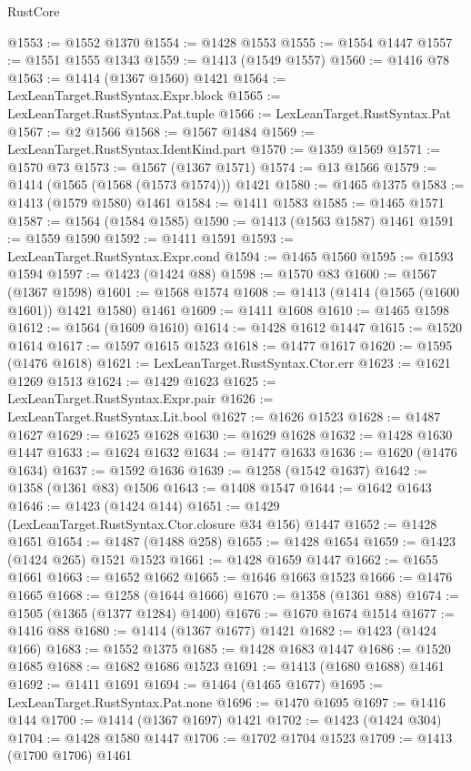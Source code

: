 \begin{lexlean}{RustCore}
\begin{coremodule}
@1553 := @1552 @1370
@1554 := @1428 @1553
@1555 := @1554 @1447
@1557 := @1551 @1555 @1343
@1559 := @1413 (@1549 @1557)
@1560 := @1416 @78
@1563 := @1414 (@1367 @1560) @1421
@1564 := LexLeanTarget.RustSyntax.Expr.block
@1565 := LexLeanTarget.RustSyntax.Pat.tuple
@1566 := LexLeanTarget.RustSyntax.Pat
@1567 := @2 @1566
@1568 := @1567 @1484
@1569 := LexLeanTarget.RustSyntax.IdentKind.part
@1570 := @1359 @1569
@1571 := @1570 @73
@1573 := @1567 (@1367 @1571)
@1574 := @13 @1566
@1579 := @1414 (@1565 (@1568 (@1573 @1574))) @1421
@1580 := @1465 @1375
@1583 := @1413 (@1579 @1580) @1461
@1584 := @1411 @1583
@1585 := @1465 @1571
@1587 := @1564 (@1584 @1585)
@1590 := @1413 (@1563 @1587) @1461
@1591 := @1559 @1590
@1592 := @1411 @1591
@1593 := LexLeanTarget.RustSyntax.Expr.cond
@1594 := @1465 @1560
@1595 := @1593 @1594
@1597 := @1423 (@1424 @88)
@1598 := @1570 @83
@1600 := @1567 (@1367 @1598)
@1601 := @1568 @1574
@1608 := @1413 (@1414 (@1565 (@1600 @1601)) @1421 @1580) @1461
@1609 := @1411 @1608
@1610 := @1465 @1598
@1612 := @1564 (@1609 @1610)
@1614 := @1428 @1612 @1447
@1615 := @1520 @1614
@1617 := @1597 @1615 @1523
@1618 := @1477 @1617
@1620 := @1595 (@1476 @1618)
@1621 := LexLeanTarget.RustSyntax.Ctor.err
@1623 := @1621 @1269 @1513
@1624 := @1429 @1623
@1625 := LexLeanTarget.RustSyntax.Expr.pair
@1626 := LexLeanTarget.RustSyntax.Lit.bool
@1627 := @1626 @1523
@1628 := @1487 @1627
@1629 := @1625 @1628
@1630 := @1629 @1628
@1632 := @1428 @1630 @1447
@1633 := @1624 @1632
@1634 := @1477 @1633
@1636 := @1620 (@1476 @1634)
@1637 := @1592 @1636
@1639 := @1258 (@1542 @1637)
@1642 := @1358 (@1361 @83) @1506
@1643 := @1408 @1547
@1644 := @1642 @1643
@1646 := @1423 (@1424 @144)
@1651 := @1429 (LexLeanTarget.RustSyntax.Ctor.closure @34 @156) @1447
@1652 := @1428 @1651
@1654 := @1487 (@1488 @258)
@1655 := @1428 @1654
@1659 := @1423 (@1424 @265) @1521 @1523
@1661 := @1428 @1659 @1447
@1662 := @1655 @1661
@1663 := @1652 @1662
@1665 := @1646 @1663 @1523
@1666 := @1476 @1665
@1668 := @1258 (@1644 @1666)
@1670 := @1358 (@1361 @88)
@1674 := @1505 (@1365 (@1377 @1284) @1400)
@1676 := @1670 @1674 @1514
@1677 := @1416 @88
@1680 := @1414 (@1367 @1677) @1421
@1682 := @1423 (@1424 @166)
@1683 := @1552 @1375
@1685 := @1428 @1683 @1447
@1686 := @1520 @1685
@1688 := @1682 @1686 @1523
@1691 := @1413 (@1680 @1688) @1461
@1692 := @1411 @1691
@1694 := @1464 (@1465 @1677)
@1695 := LexLeanTarget.RustSyntax.Pat.none
@1696 := @1470 @1695
@1697 := @1416 @144
@1700 := @1414 (@1367 @1697) @1421
@1702 := @1423 (@1424 @304)
@1704 := @1428 @1580 @1447
@1706 := @1702 @1704 @1523
@1709 := @1413 (@1700 @1706) @1461

\end{coremodule}
\end{lexlean}
